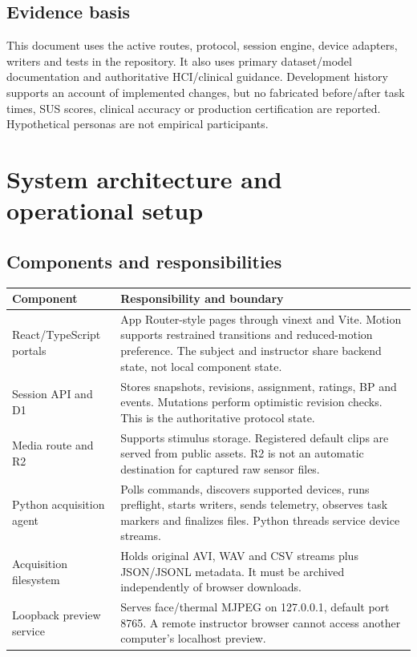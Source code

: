 \documentclass[11pt,a4paper]{article}
\begin{document}
\subsection{Evidence basis}
This document uses the active routes, protocol, session engine, device adapters, writers and tests in the repository. It also uses primary dataset/model documentation and authoritative HCI/clinical guidance. Development history supports an account of implemented changes, but no fabricated before/after task times, SUS scores, clinical accuracy or production certification are reported. Hypothetical personas are not empirical participants.

\section{System architecture and operational setup}
\subsection{Components and responsibilities}
\begin{longtable}{@{}L{.24\textwidth}L{.69\textwidth}@{}}
\toprule Component & Responsibility and boundary\\\midrule\endhead
React/TypeScript portals & App Router-style pages through vinext and Vite. Motion supports restrained transitions and reduced-motion preference. The subject and instructor share backend state, not local component state.\\
Session API and D1 & Stores snapshots, revisions, assignment, ratings, BP and events. Mutations perform optimistic revision checks. This is the authoritative protocol state.\\
Media route and R2 & Supports stimulus storage. Registered default clips are served from public assets. R2 is not an automatic destination for captured raw sensor files.\\
Python acquisition agent & Polls commands, discovers supported devices, runs preflight, starts writers, sends telemetry, observes task markers and finalizes files. Python threads service device streams.\\
Acquisition filesystem & Holds original AVI, WAV and CSV streams plus JSON/JSONL metadata. It must be archived independently of browser downloads.\\
Loopback preview service & Serves face/thermal MJPEG on 127.0.0.1, default port 8765. A remote instructor browser cannot access another computer's localhost preview.\\
\bottomrule
\end{longtable}
\end{document}
